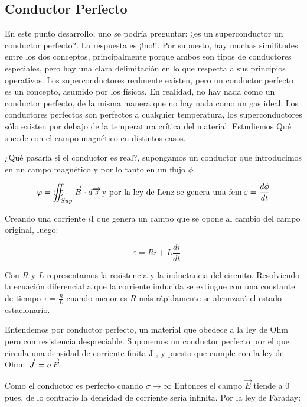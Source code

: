 \subsection{Conductor Perfecto}

En este punto desarrollo, uno se podría preguntar: ¿es un superconductor un conductor perfecto?. La respuesta es ¡!no!!. Por supuesto, hay muchas similitudes entre los dos conceptos, principalmente porque ambos son tipos de conductores especiales, pero hay una clara delimitación en lo que respecta a sus principios operativos. Los superconductores realmente existen, pero un conductor perfecto es un concepto, asumido por los físicos. En realidad, no hay nada como un conductor perfecto, de la misma manera que no hay nada como un gas ideal. Los conductores perfectos son perfectos a cualquier temperatura, los superconductores sólo existen por debajo de la temperatura crítica del material. Estudiemos Qué sucede con el campo magnético en distintos casos.

¿Qué pasaría si el conductor es real?, supongamos un conductor que introducimos en un campo magnético y por lo tanto en un flujo $\phi$

\begin{equation}
	\varphi=\oiint_{Sup}\overrightarrow{B} \cdot d\overrightarrow{s } \, \text{y por la ley de Lenz se genera una fem} \; \varepsilon=\frac{d\phi}{dt}
\end{equation}

Creando una corriente $i$I que genera un campo que se opone al cambio del campo original, luego:

\begin{equation}
	- \varepsilon= Ri+L\frac{di}{dt}
\end{equation}

Con $R$ y $L$ representamos la resistencia y la inductancia del circuito. Resolviendo la ecuación diferencial a que la corriente inducida se extingue con una constante de tiempo $\tau=\frac{R}{L}$ cuando menor es $R$ más rápidamente se alcanzará el estado estacionario.

Entendemos por conductor perfecto, un material que obedece a la ley de Ohm pero con resistencia despreciable. Suponemos un conductor perfecto por el que circula una densidad de corriente finita J , y puesto que cumple con la ley de Ohm: $\overrightarrow{J}=\sigma \overrightarrow{E}$

Como el conductor es perfecto cuando $\sigma\rightarrow \infty$ Entonces el campo $\overrightarrow{E}$ tiende a 0 pues, de lo contrario la densidad de corriente sería infinita. Por la ley de Faraday:

